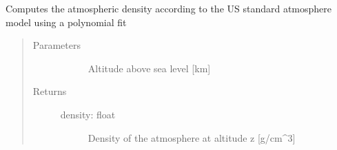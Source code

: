 \documentclass[letterpaper,10pt,english]{sphinxmanual}
\begin{document}

\begin{fulllineitems}
\label{\detokenize{stochprop.eofs:stochprop.eofs.density}}
Computes the atmospheric density according to the US standard atmosphere model using a polynomial fit
\begin{quote}\begin{description}
\item[{Parameters}] \leavevmode\begin{description}
\item[{}] \leavevmode
Altitude above sea level {[}km{]}

\end{description}

\item[{Returns}] \leavevmode\begin{description}
\item[{density: float}] \leavevmode
Density of the atmosphere at altitude z {[}g/cm\textasciicircum{}3{]}

\end{description}

\end{description}\end{quote}

\end{fulllineitems}

\end{document}
